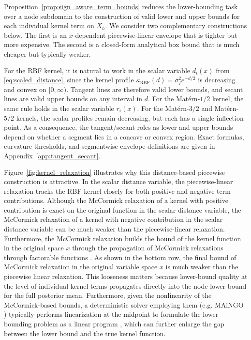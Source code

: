 \documentclass[pdflatex,sn-mathphys-num]{sn-jnl}%
\theoremstyle{thmstyleone}%
\theoremstyle{thmstyletwo}%
\theoremstyle{thmstylethree}%
\begin{document}
Proposition~\ref{prop:sign_aware_term_bounds} reduces the lower-bounding task over a node subdomain to the construction of valid lower and upper bounds for each individual kernel term on $X_h$. We consider two complementary constructions below. The first is an $x$-dependent piecewise-linear envelope that is tighter but more expensive. The second is a closed-form analytical box bound that is much cheaper but typically weaker.

For the RBF kernel, it is natural to work in the scalar variable $d_i(x)$ from \eqref{eq:scaled_distance}, since the kernel profile $\kappa_{\mathrm{RBF}}(d)=\sigma_f^2 e^{-d/2}$ is decreasing and convex on $[0,\infty)$. Tangent lines are therefore valid lower bounds, and secant lines are valid upper bounds on any interval in $d$. For the Mat\'ern-$1/2$ kernel, the same rule holds in the scalar variable $r_i(x)$. For the Mat\'ern-$3/2$ and Mat\'ern-$5/2$ kernels, the scalar profiles remain decreasing, but each has a single inflection point. As a consequence, the tangent/secant roles as lower and upper bounds depend on whether a segment lies in a concave or convex region. Exact formulas, curvature thresholds, and segmentwise envelope definitions are given in Appendix~\ref{app:tangent_secant}.

Figure~\ref{fig:kernel_relaxation} illustrates why this distance-based piecewise construction is attractive. In the scalar distance variable, the piecewise-linear relaxation tracks the RBF kernel closely for both positive and negative term contributions. Although the McCormick relaxation of a kernel with positive contribution is exact on the original function in the scalar distance variable, the McCormick relaxation of a kernel with negative contribution in the scalar distance variable can be much weaker than the piecewise-linear relaxation. Furthermore, the McCormick relaxation builds the bound of the kernel function in the original space $x$ through the propagation of McCormick relaxations through factorable functions \cite{ref:mccormick}. As shown in the bottom row, the final bound of McCormick relaxation in the original variable space $x$ is much weaker than the piecewise linear relaxation. This looseness matters because lower-bound quality at the level of individual kernel terms propagates directly into the node lower bound for the full posterior mean. Furthermore, given the nonlinearity of the McCormick-based bounds, a deterministic solver employing them (e.g. MAiNGO \cite{ref:maingo}) typically performs linearization at the midpoint to formulate the lower bounding problem as a linear program \cite{bongartz2017deterministic}, which can further enlarge the gap between the lower bound and the true kernel function.
\end{document}
